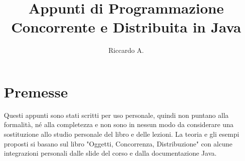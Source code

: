 

\author{Riccardo A.}
\title{Appunti di Programmazione Concorrente e Distribuita in Java}



\maketitle

\section*{Premesse}
Questi appunti sono stati scritti per uso personale, quindi non puntano alla formalità, né alla completezza e non sono in nessun modo da considerare una sostituzione allo studio personale del libro e delle lezioni. La teoria e gli esempi proposti si basano sul libro "Oggetti, Concorrenza, Distribuzione" con alcune integrazioni personali dalle slide del corso e dalla documentazione Java.

\tableofcontents





